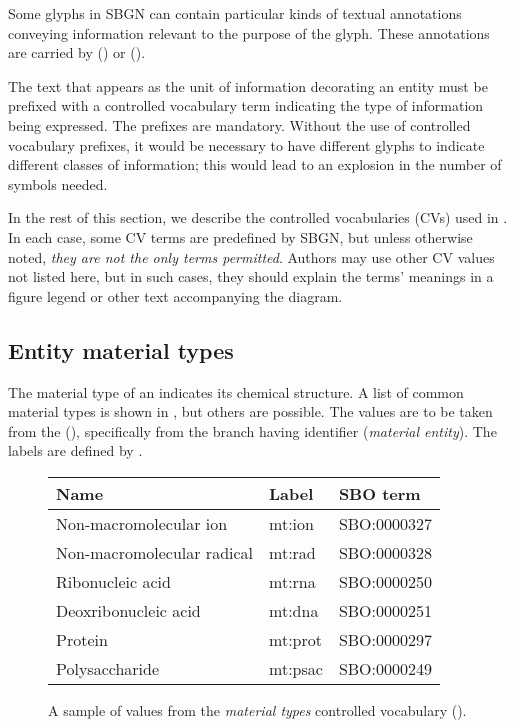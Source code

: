 
Some glyphs in SBGN \ERs can contain particular kinds of textual annotations conveying information relevant to the purpose of the glyph.  These annotations are carried by  () or  ().

The text that appears as the unit of information decorating an entity must be prefixed with a controlled vocabulary term indicating the type of information being expressed.  The prefixes are mandatory.  Without the use of controlled vocabulary prefixes, it would be necessary to have different glyphs to indicate different classes of information; this would lead to an explosion in the number of symbols needed.

In the rest of this section, we describe the controlled vocabularies (CVs) used in \SBGNERLone.  In each case, some CV terms are predefined by SBGN, but unless otherwise noted, \emph{they are not the only terms permitted}.  Authors may use other CV values not listed here, but in such cases, they should explain the terms' meanings in a figure legend or other text accompanying the diagram.

\subsection{Entity material types}
\label{sec:material-types-cv}

The material type of an  indicates its chemical structure.  A list of common material types is shown in , but others are possible.  The values are to be taken from the \sbo (\sbourl), specifically from the branch having identifier  (\emph{material entity}).  The labels are defined by \SBGNERLone.

\begin{figure}[h]
  \centering
  \begin{tabular}{l>{\ttfamily}ll}
    \toprule
    \textbf{Name}              & \textbf{\rmfamily Label} & \textbf{SBO term} \\
    \midrule
    Non-macromolecular ion     & mt:ion  & SBO:0000327\\
    Non-macromolecular radical & mt:rad  & SBO:0000328\\
    Ribonucleic acid           & mt:rna  & SBO:0000250\\
    Deoxribonucleic acid       & mt:dna  & SBO:0000251\\
    Protein                    & mt:prot & SBO:0000297\\
    Polysaccharide             & mt:psac & SBO:0000249\\
    \bottomrule
  \end{tabular}
  \caption{A sample of values from the \emph{material types} controlled
    vocabulary ().}
  \label{fig:material-types-cv}
\end{figure}

